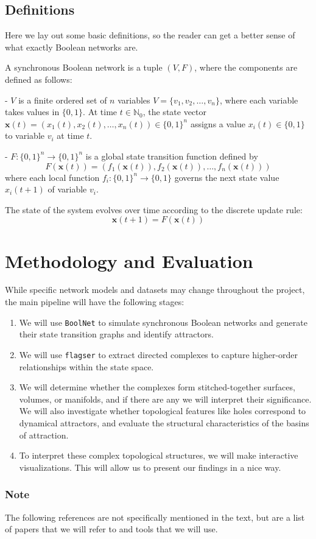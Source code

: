 \documentclass[sigconf]{acmart}
\begin{document}
\subsection{Definitions}

Here we lay out some basic definitions, so the reader can get a better sense of what exactly Boolean networks are.

A synchronous Boolean network is a tuple $(V, F)$, where the components are defined as follows:

- $V$ is a finite ordered set of $n$ variables $V = \{v_1, v_2, \dots, v_n\}$, where each variable takes values in $\{0, 1\}$.
At time $t \in \mathbb{N}_0$, the state vector $\mathbf{x}(t) = (x_1(t), x_2(t), \dots, x_n(t)) \in \{0, 1\}^n$ assigns a value $x_i(t) \in \{0, 1\}$ to variable $v_i$ at time $t$. 

- $F: \{0, 1\}^n \rightarrow \{0, 1\}^n$ is a global state transition function defined by
$$
F(\mathbf{x}(t)) = (f_1(\mathbf{x}(t)), f_2(\mathbf{x}(t)), \dots, f_n(\mathbf{x}(t)))
$$
where each local function $f_i: \{0, 1\}^n \rightarrow \{0, 1\}$ governs the next state value $x_i(t + 1)$ of variable $v_i$.

The state of the system evolves over time according to the discrete update rule:
$$
\mathbf{x}(t + 1) = F(\mathbf{x}(t))
$$

\section{Methodology and Evaluation}

 While specific network models and datasets may change throughout the project, the main pipeline will have the following stages:

\begin{enumerate}
    \item 
    We will use \texttt{BoolNet} to simulate synchronous Boolean networks and generate their state transition graphs and identify attractors.

    \item 
     We will use \texttt{flagser} to extract directed complexes to capture higher-order relationships within the state space.

    \item 
     We will determine whether the complexes form stitched-together surfaces, volumes, or manifolds, and if there are any we will interpret their significance. We will also investigate whether topological features like holes correspond to dynamical attractors, and evaluate the structural characteristics of the basins of attraction.

    \item 
    To interpret these complex topological structures, we will make interactive visualizations. This will allow us to present our findings in a nice way.
\end{enumerate}

\subsubsection*{Note}

The following references are not specifically mentioned in the text, but are a list of papers that we will refer to and tools that we will use.

\nocite{*}




\end{document}
